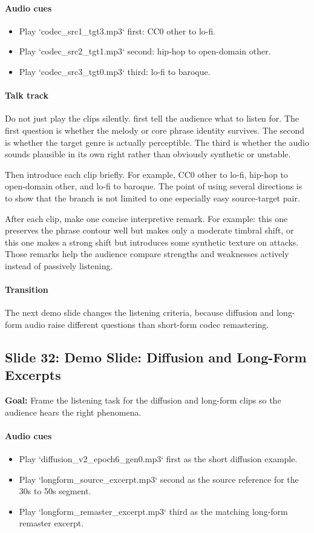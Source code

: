 \documentclass[11pt]{article}
\begin{document}
\paragraph{Audio cues}
\begin{itemize}
\item Play `codec\_src1\_tgt3.mp3` first: CC0 other to lo-fi.
\item Play `codec\_src2\_tgt1.mp3` second: hip-hop to open-domain other.
\item Play `codec\_src3\_tgt0.mp3` third: lo-fi to baroque.
\end{itemize}
\paragraph{Talk track}
Do not just play the clips silently. first tell the audience what to listen for. The first question is whether the melody or core phrase identity survives. The second is whether the target genre is actually perceptible. The third is whether the audio sounds plausible in its own right rather than obviously synthetic or unstable.

Then introduce each clip briefly. For example, CC0 other to lo-fi, hip-hop to open-domain other, and lo-fi to baroque. The point of using several directions is to show that the branch is not limited to one especially easy source-target pair.

After each clip, make one concise interpretive remark. For example: this one preserves the phrase contour well but makes only a moderate timbral shift, or this one makes a strong shift but introduces some synthetic texture on attacks. Those remarks help the audience compare strengths and weaknesses actively instead of passively listening.

\paragraph{Transition}
The next demo slide changes the listening criteria, because diffusion and long-form audio raise different questions than short-form codec remastering.

\subsection*{Slide 32: Demo Slide: Diffusion and Long-Form Excerpts}
\textbf{Goal:} Frame the listening task for the diffusion and long-form clips so the audience hears the right phenomena.
\paragraph{Audio cues}
\begin{itemize}
\item Play `diffusion\_v2\_epoch6\_gen0.mp3` first as the short diffusion example.
\item Play `longform\_source\_excerpt.mp3` second as the source reference for the 30s to 50s segment.
\item Play `longform\_remaster\_excerpt.mp3` third as the matching long-form remaster excerpt.
\end{itemize}
\end{document}
